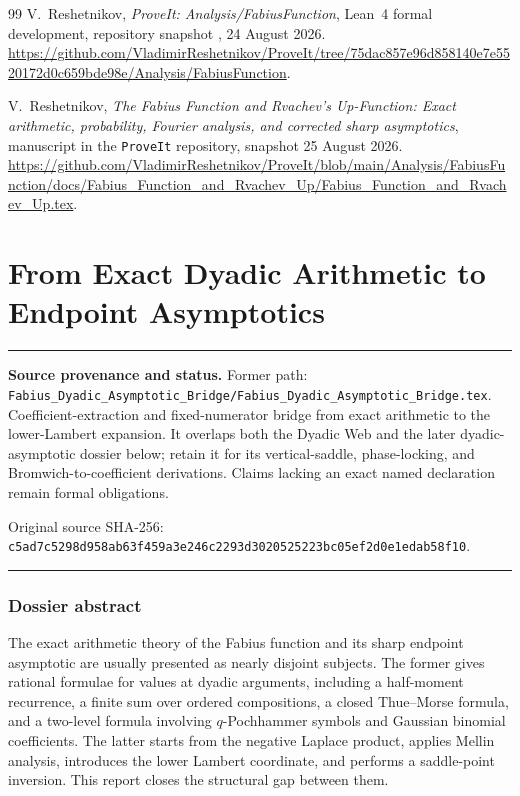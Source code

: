 \documentclass[11pt,oneside]{article}
\theoremstyle{definition}
\theoremstyle{remark}
\newenvironment{boxedremark}{%
  \par\smallskip\noindent\begin{center}\begin{minipage}{0.94\textwidth}%
  \color{black}\hrule\vspace{0.6em}\small
}{%
  \vspace{0.6em}\hrule\end{minipage}\end{center}\smallskip
}
\begin{document}
\begin{thebibliography}{99}
V.~Reshetnikov,
\newblock \emph{ProveIt: Analysis/FabiusFunction},
\newblock Lean~4 formal development, repository snapshot
  , 24 August 2026.
\newblock \url{https://github.com/VladimirReshetnikov/ProveIt/tree/75dac857e96d858140e7e5520172d0c659bde98e/Analysis/FabiusFunction}.

V.~Reshetnikov,
\newblock \emph{The Fabius Function and Rvachev's Up-Function: Exact arithmetic,
  probability, Fourier analysis, and corrected sharp asymptotics},
\newblock manuscript in the \texttt{ProveIt} repository, snapshot 25 August 2026.
\newblock \url{https://github.com/VladimirReshetnikov/ProveIt/blob/main/Analysis/FabiusFunction/docs/Fabius_Function_and_Rvachev_Up/Fabius_Function_and_Rvachev_Up.tex}.

\end{thebibliography}


\renewcommand{\arraystretch}{1}

\clearpage
\part{From Exact Dyadic Arithmetic to Endpoint Asymptotics}
\label{part:dyadicasymbridge}
\begin{boxedremark}
\textbf{Source provenance and status.} Former path: \nolinkurl{Fabius_Dyadic_Asymptotic_Bridge/Fabius_Dyadic_Asymptotic_Bridge.tex}.  Coefficient-extraction and fixed-numerator bridge from exact arithmetic to the lower-Lambert expansion.  It overlaps both the Dyadic Web and the later dyadic-asymptotic dossier below; retain it for its vertical-saddle, phase-locking, and Bromwich-to-coefficient derivations.  Claims lacking an exact named declaration remain formal obligations.\par\smallskip Original source SHA-256: \nolinkurl{c5ad7c5298d958ab63f459a3e246c2293d3020525223bc05ef2d0e1edab58f10}.
\end{boxedremark}
\section*{Dossier abstract}
The exact arithmetic theory of the Fabius function and its sharp endpoint asymptotic are usually presented as nearly disjoint subjects.  The former gives rational formulae for values at dyadic arguments, including a half-moment recurrence, a finite sum over ordered compositions, a closed Thue--Morse formula, and a two-level formula involving $q$-Pochhammer symbols and Gaussian binomial coefficients.  The latter starts from the negative Laplace product, applies Mellin analysis, introduces the lower Lambert coordinate, and performs a saddle-point inversion.  This report closes the structural gap between them.
\end{document}
